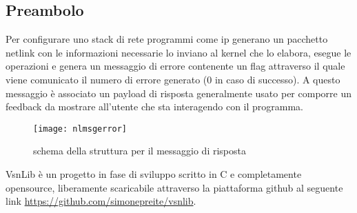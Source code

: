 \subsection{Preambolo}
Per configurare uno stack di rete programmi come ip generano un pacchetto netlink con le informazioni necessarie lo inviano al kernel che lo elabora, esegue le operazioni e genera un messaggio di errore contenente un flag attraverso il quale viene comunicato il numero di errore generato (0 in caso di successo). A questo messaggio \`e associato un payload di risposta generalmente usato per comporre un feedback da mostrare all'utente che sta interagendo con il programma.\\
\begin{figure}[h]                       %
\begin{center}                          %
\texttt{[image: nlmsgerror]}%
%
\caption[struct nlmserror]{schema della struttura per il messaggio di risposta}
\end{center}
\end{figure}
VsnLib \`e un progetto in fase di sviluppo scritto in C e completamente opensource, liberamente scaricabile attraverso la piattaforma github al seguente link \url{https://github.com/simonepreite/vsnlib}.

